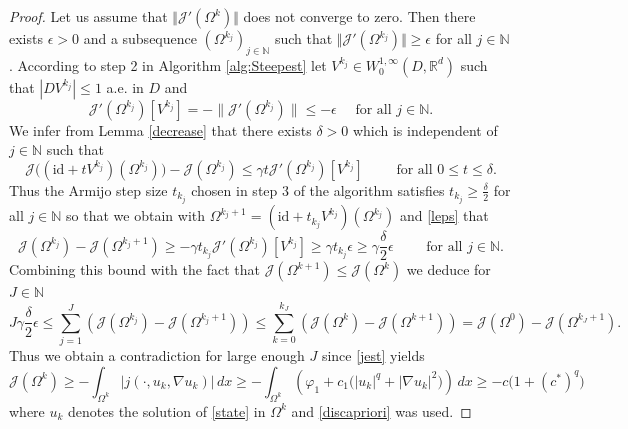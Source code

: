\documentclass[a4paper,10pt]{article}
\newcommand{\dx}{\,dx}
\theoremstyle{plain}
\theoremstyle{plain}
\numberwithin{equation}{section}
\begin{document}
\begin{proof} Let us assume that $\Vert \mathcal J'(\Omega^k) \Vert$ 
does not converge to zero. Then there exists $\epsilon>0$ and a subsequence $(\Omega^{k_j})_{j \in \mathbb N}$
such that $\Vert \mathcal J'(\Omega^{k_j}) \Vert \geq \epsilon$ for all  $j\in \mathbb N$. According to step 2 in Algorithm \ref{alg:Steepest}
let $V^{k_j} \in W^{1,\infty}_0(D,\mathbb R^d)$ such that $| D V^{k_j} | \leq 1$ a.e. in $D$ and 
\begin{equation} \label{leps}
\mathcal J'(\Omega^{k_j})[V^{k_j}] = -  \|\mathcal{J}'(\Omega^{k_j})\| \leq - \epsilon \quad \mbox{ for all } j \in \mathbb N.
\end{equation}
We infer from Lemma \ref{decrease} that there exists $\delta>0$ which is independent of $j \in \mathbb N$ such that
\begin{displaymath}
\mathcal J\bigl( (\mbox{id}+ t V^{k_j})(\Omega^{k_j}) \bigr)  - \mathcal J(\Omega^{k_j}) \leq \gamma t \mathcal J'(\Omega^{k_j})[V^{k_j}] 
 \qquad \mbox{ for all } 0 \leq t \leq \delta.
\end{displaymath}
Thus the Armijo step size  $t_{k_j} $ chosen in step 3 of
the algorithm satisfies $t_{k_j} \geq \frac{\delta}{2}$ for all $j \in \mathbb N$ so that we obtain with
$\Omega^{k_j+1} = (\mbox{id}+t_{k_j} V^{k_j})(\Omega^{k_j})$
and \eqref{leps} that
\begin{displaymath}
\mathcal J(\Omega^{k_j}) - \mathcal J(\Omega^{k_{j}+1}) \geq -\gamma t_{k_j} \mathcal J'(\Omega^{k_j})[V^{k_j}]  \geq \gamma t_{k_j} \epsilon
 \geq \gamma \frac{\delta}{2} \epsilon \qquad  \mbox{ for all } j \in \mathbb N.
\end{displaymath}
Combining this bound with the fact that 
$\mathcal J(\Omega^{k+1}) \leq \mathcal J(\Omega^k)$ 
we deduce for $J \in \mathbb N$
\begin{displaymath}
J \gamma \frac{\delta}{2} \epsilon \leq \sum_{j=1}^J (
\mathcal J(\Omega^{k_j}) - \mathcal J(\Omega^{k_{j}+1}))
\leq \sum_{k=0}^{k_J} (\mathcal J(\Omega^k) - \mathcal J(\Omega^{k+1})) = \mathcal J(\Omega^0) - \mathcal J(
\Omega^{k_J+1}).
\end{displaymath}
Thus we obtain a contradiction for large enough $J$ since \eqref{jest} yields
\begin{displaymath}
\mathcal J(\Omega^k)  \geq   - \int_{\Omega^k} | j(\cdot,u_k,\nabla u_k) |  \dx \geq - \int_{\Omega^k} \left( \varphi_1+ c_1 \bigl(  | u_k |^q + | \nabla u_k |^2 \bigr) \right)  \dx  
 \geq  - c \bigl( 1+ (c^*)^q  \bigr)
\end{displaymath}
where $u_k$ denotes the solution of \eqref{state} in $\Omega^k$ and \eqref{discapriori} was used. 
\end{proof}
\end{document}
